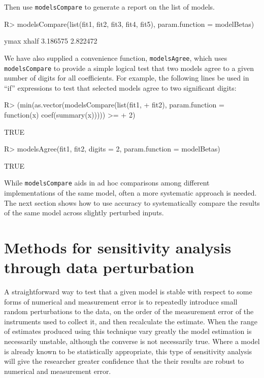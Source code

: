 \documentclass[11pt]{article}
\let\code=\texttt
\newcommand{\pkg}[1]{{\normalfont\fontseries{b}\selectfont #1}}
\begin{document}
Then use \code{modelsCompare} to generate a report on the list of models.

\begin{Schunk}
\begin{Sinput}
R> modelsCompare(list(fit1, fit2, fit3, fit4, fit5), param.function = modelBetas)
\end{Sinput}
\begin{Soutput}
    ymax    xhalf 
3.186575 2.822472 
\end{Soutput}
\end{Schunk}


We have also supplied a convenience function, \code{modelsAgree}, which uses \code{modelsCompare} to provide a simple logical test that two models agree
to a given number of digits for all coefficients. For example, the following lines
 be used in ``if'' expressions to test that selected models agree to two 
 significant digits:                                 

\begin{Schunk}
\begin{Sinput}
R> (min(as.vector(modelsCompare(list(fit1, 
+     fit2), param.function = function(x) coef(summary(x))))) >= 
+     2)
\end{Sinput}
\begin{Soutput}
[1] TRUE
\end{Soutput}
\begin{Sinput}
R> modelsAgree(fit1, fit2, digits = 2, param.function = modelBetas)
\end{Sinput}
\begin{Soutput}
[1] TRUE
\end{Soutput}
\end{Schunk}

While \code{modelsCompare} aids in ad hoc comparisons among different implementations of the same model, often a more systematic approach is needed. The next section shows how to use \pkg{accuracy} to systematically compare the results of the same model across slightly perturbed inputs. 

\section{Methods for sensitivity analysis through data perturbation}

A straightforward way to test that a given model is stable with respect to
some forms of numerical and measurement error is 
to repeatedly introduce small random perturbations to the data, on the order of the measurement error of the instruments used to collect it, and then recalculate the estimate. When the range of estimates produced using 
this technique vary greatly the model estimation is necessarily unstable, although
the converse is not necessarily true. Where a model is already known to be statistically appropriate,
this type of sensitivity analysis will give the researcher greater confidence that the their 
results are robust to numerical and measurement error.
\end{document}
